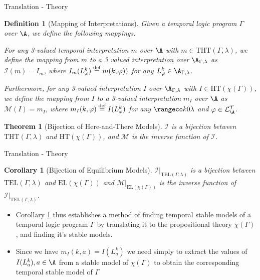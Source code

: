 \documentclass[aspectratio=169,xcolor=svgnames]{beamer}
\theoremstyle{theoremstyle_space}
\newtheorem{definition}{Definition}
\newtheorem{theorem}{Theorem}
\newtheorem{corollary}{Corollary}
\begin{document}
\begin{frame}[t]{Translation - Theory}
  \begin{definition}[Mapping of Interpretations]
  Given a temporal logic program $\Gamma$ over $\A$, we define the
  following mappings.  

  For any 3-valued temporal interpretation $m$
  over $\A$ with $m \in \text{THT}(\Gamma,\lambda)$, we define the
  mapping from $m$ to a 3 valued interpretation over
  $\A_{\Gamma,\lambda}$ as $\mathcal{I}(m) = I_m$, where
  $I_m(L^k_\varphi) \stackrel{\text{def}}{=} m(k,\varphi))$ for any
  $L^k_\varphi \in \A_{\Gamma,\lambda}$.

  Furthermore, for any 3-valued interpretation $I$ over
  $\A_{\Gamma,\lambda}$ with $I \in \text{HT}(\chi(\Gamma))$, we
  define the mapping from $I$ to a 3-valued interpretation $m_I$ over
  $\A$ as $\mathcal{M}(I) = m_I$, where
  $m_I(k,\varphi) \stackrel{\text{def}}{=} I(L_{\varphi}^k)$ for any $\kinlambda$ and
  $\varphi \in \langat$.
\end{definition}
\begin{theorem}[Bijection of Here-and-There Models]\label{theorem:translation}
  $\mathcal{I}$ is a bijection between $\text{THT}(\Gamma,\lambda)$
  and $\text{HT}(\chi(\Gamma))$, and $\mathcal{M}$ is the inverse
  function of $\mathcal{I}$.
\end{theorem}
\end{frame}

\begin{frame}[t]{Translation - Theory}
\begin{corollary}[Bijection of Equilibrium Models]\label{cor:bijection-of-sm}
  $\mathcal{I}\vert_{\text{TEL}(\Gamma,\lambda)}$ is a bijection
  between $\text{TEL}(\Gamma,\lambda)$ and $\text{EL}(\chi(\Gamma))$
  and $\mathcal{M}\vert_{\text{EL}(\chi(\Gamma))}$ is the inverse
  function of $\mathcal{I}\vert_{\text{TEL}(\Gamma,\lambda)}$.
\end{corollary}
\begin{itemize}
\item Corollary \ref{cor:bijection-of-sm} thus establishes a method of
  finding temporal stable models of a temporal logic program $\Gamma$
  by translating it to the propositional theory $\chi(\Gamma)$, and
  finding it's stable models. 
\item Since we have $m_I(k,a)=I(L_a^k)$ we need simply to extract the
  values of $I(L_a^k), a\in \A$ from a stable model of $\chi(\Gamma)$
  to obtain the corresponding temporal stable model of $\Gamma$
\end{itemize}
\end{frame}
\end{document}
